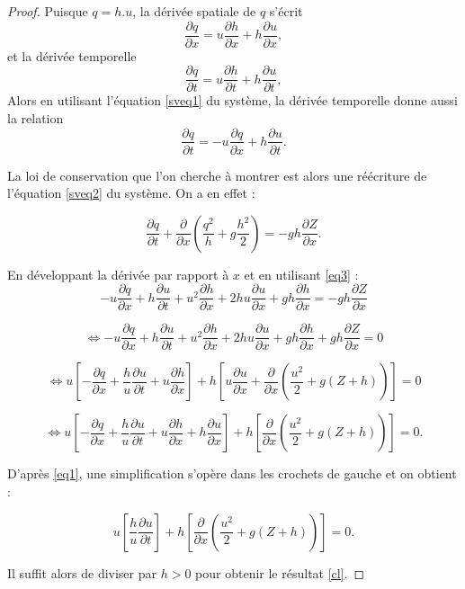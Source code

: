 \documentclass[
11pt, %
francais, %
singlespacing, %
headsepline, %
f%
]{MastersDoctoralThesis} %
\theoremstyle{definition}
\begin{document}
\begin{proof}
Puisque $q=h.u$, la dérivée spatiale de $q$ s'écrit  \begin{equation}\frac{\partial q}{\partial x} = u\frac{\partial h}{\partial x}+h\frac{\partial u}{\partial x}, \label{eq1}\end{equation}
et la dérivée temporelle  \begin{equation} \frac{\partial q}{\partial t} =  u\frac{\partial h}{\partial t} +  h\frac{\partial u}{\partial t}, \label{eq2} \end{equation}
Alors en utilisant l'équation \ref{sveq1} du système, la dérivée temporelle donne aussi la relation \begin{equation}  \frac{\partial q}{\partial t}=-u\frac{\partial q}{\partial x}+h\frac{\partial u}{\partial t}. \label{eq3}\end{equation}

La loi de conservation que l'on cherche à montrer est alors une réécriture de l'équation \ref{sveq2} du système. On a en effet :

$$
\frac{\partial q}{\partial t} + \frac{\partial }{\partial x}(\frac{q^{2}}{h}+g\frac{h^{2}}{2}) = -gh\frac{\partial Z}{\partial x}.
$$

En développant la dérivée par rapport à $x$ et en utilisant \eqref{eq3} : 
$$
-u\frac{\partial q}{\partial x}+h\frac{\partial u}{\partial t}+u^{2}\frac{\partial h }{\partial x}+2hu\frac{\partial u}{\partial x} +gh\frac{\partial h}{\partial x}= -gh\frac{\partial Z}{\partial x}
$$

$$
\Leftrightarrow -u\frac{\partial q}{\partial x}+h\frac{\partial u}{\partial t}+u^{2}\frac{\partial h }{\partial x}+2hu\frac{\partial u}{\partial x} +gh\frac{\partial h}{\partial x} + gh\frac{\partial Z}{\partial x} =0
$$

$$
\Leftrightarrow u\left[-\frac{\partial q}{\partial x}+\frac{h}{u}\frac{\partial u}{\partial t}+u\frac{\partial h }{\partial x}\right]+h\left[u \frac{\partial u}{\partial x}+\frac{\partial}{\partial x}(\frac{u^{2}}{2}+g(Z+h))\right] =0
$$

$$
\Leftrightarrow u\left[-\frac{\partial q}{\partial x}+\frac{h}{u}\frac{\partial u}{\partial t}+u\frac{\partial h }{\partial x} + h\frac{\partial u }{\partial x}\right]+h\left[\frac{\partial}{\partial x}(\frac{u^{2}}{2}+g(Z+h))\right] =0.
$$


D'après \eqref{eq1}, une simplification s'opère dans les crochets de gauche et on obtient :

$$
u\left[\frac{h}{u}\frac{\partial u}{\partial t}\right]+h\left[\frac{\partial}{\partial x}(\frac{u^{2}}{2}+g(Z+h))\right] =0.
$$

Il suffit alors de diviser par $h>0$ pour obtenir le résultat \eqref{cl}.

\end{proof}
\end{document}
